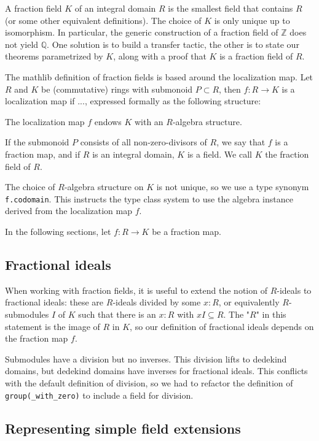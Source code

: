 \documentclass{lipics-v2021}
\newcommand{\lean}[1]{\texttt{#1}\xspace} %
\newcommand{\Q}{\mathbb{Q}}
\newcommand{\Z}{\mathbb{Z}}
\begin{document}
A fraction field $K$ of an integral domain $R$ is the smallest field that contains $R$ (or some other equivalent definitions).
The choice of $K$ is only unique up to isomorphism.
In particular, the generic construction of a fraction field of $\Z$ does not yield $\Q$.
One solution is to build a transfer tactic, the other is to state our theorems parametrized by $K$, along with a proof that $K$ is a fraction field of $R$.

The mathlib definition of fraction fields is based around the localization map. Let $R$ and $K$ be (commutative) rings with submonoid $P \subset R$, then $f : R \to K$ is a localization map if ..., expressed formally as the following structure:

The localization map $f$ endows $K$ with an $R$-algebra structure.

If the submonoid $P$ consists of all non-zero-divisors of $R$, we say that $f$ is a fraction map, and if $R$ is an integral domain, $K$ is a field. We call $K$ the fraction field of $R$.

The choice of $R$-algebra structure on $K$ is not unique, so we use a type synonym \lean{f.codomain}. This instructs the type class system to use the algebra instance derived from the localization map $f$.

In the following sections, let $f : R \to K$ be a fraction map.

\subsection{Fractional ideals}

When working with fraction fields, it is useful to extend the notion of $R$-ideals to fractional ideals: these are $R$-ideals divided by some $x : R$, or equivalently $R$-submodules $I$ of $K$ such that there is an $x : R$ with $x I \subseteq R$. The "$R$" in this statement is the image of $R$ in $K$, so our definition of fractional ideals depends on the fraction map $f$.

Submodules have a division but no inverses. This division lifts to dedekind domains, but dedekind domains have inverses for fractional ideals. This conflicts with the default definition of division, so we had to refactor the definition of \lean{group(\_with\_zero)} to include a field for division.

\subsection{Representing simple field extensions}
\end{document}
